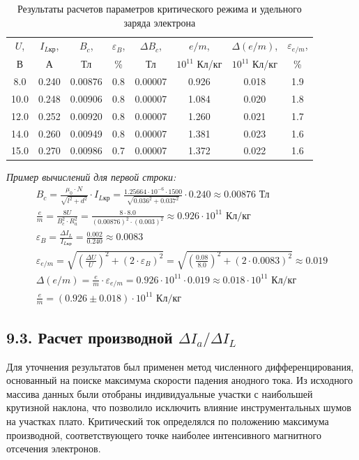 \documentclass[a4paper,12pt]{article}
\begin{document}
\begin{table}[H]
    \caption{Результаты расчетов параметров критического режима и удельного заряда электрона}
    \label{tab:results_calc_full}
    \centering
    \begin{tabular}{|c|c|c|c|c|c|c|c|}
        \hline
        $U$, & $I_{L\text{кр}}$, & $B_c$, & $\varepsilon_B$, & $\Delta B_c$, & $e/m$, & $\Delta(e/m)$, & $\varepsilon_{e/m}$, \\ 
        В & А & Тл & \% & Тл & $10^{11}$ Кл/кг & $10^{11}$ Кл/кг & \% \\ \hline
        8.0  & 0.240 & 0.00876 & 0.8 & 0.00007 & 0.926 & 0.018 & 1.9 \\ \hline
        10.0 & 0.248 & 0.00906 & 0.8 & 0.00007 & 1.084 & 0.020 & 1.8 \\ \hline
        12.0 & 0.252 & 0.00920 & 0.8 & 0.00007 & 1.260 & 0.021 & 1.7 \\ \hline
        14.0 & 0.260 & 0.00949 & 0.8 & 0.00007 & 1.381 & 0.023 & 1.6 \\ \hline
        15.0 & 0.270 & 0.00986 & 0.7 & 0.00007 & 1.372 & 0.022 & 1.6 \\ \hline
    \end{tabular}
\end{table}

\textit{Пример вычислений для первой строки:}
\begin{gather*}
    B_c = \frac{\mu_0 \cdot N}{\sqrt{l^2 + d^2}} \cdot I_{L\text{кр}} = \frac{1.25664 \cdot 10^{-6} \cdot 1500}{\sqrt{0.036^2 + 0.037^2}} \cdot 0.240 \approx 0.00876 \text{ Тл} \\
    \frac{e}{m} = \frac{8U}{B_c^2 \cdot R_a^2} = \frac{8 \cdot 8.0}{(0.00876)^2 \cdot (0.003)^2} \approx 0.926 \cdot 10^{11} \text{ Кл/кг} \\
    \varepsilon_B = \frac{\Delta I_L}{I_{L\text{кр}}} = \frac{0.002}{0.240} \approx 0.0083 \\
    \varepsilon_{e/m} = \sqrt{\left(\frac{\Delta U}{U}\right)^2 + (2 \cdot \varepsilon_B)^2} = \sqrt{\left(\frac{0.08}{8.0}\right)^2 + (2 \cdot 0.0083)^2} \approx 0.019 \\
    \Delta(e/m) = \frac{e}{m} \cdot \varepsilon_{e/m} = 0.926 \cdot 10^{11} \cdot 0.019 \approx 0.018 \cdot 10^{11} \text{ Кл/кг} \\
    \frac{e}{m} = (0.926 \pm 0.018) \cdot 10^{11} \text{ Кл/кг}
\end{gather*}

\subsection*{9.3. Расчет производной $\Delta I_a / \Delta I_L$}
Для уточнения результатов был применен метод численного дифференцирования, основанный на поиске максимума скорости падения анодного тока. Из исходного массива данных были отобраны индивидуальные участки с наибольшей крутизной наклона, что позволило исключить влияние инструментальных шумов на участках плато. Критический ток определялся по положению максимума производной, соответствующего точке наиболее интенсивного магнитного отсечения электронов.
\end{document}
